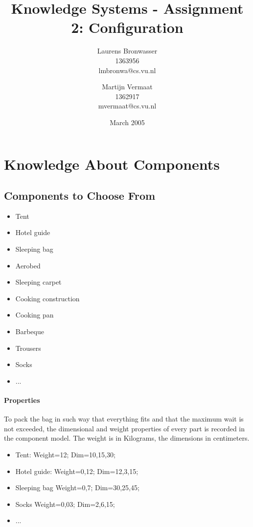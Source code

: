 \documentclass[a4paper,11pt]{article}
\title{Knowledge Systems - Assignment 2: Configuration}
\author{Laurens Bronwasser\\
1363956\\
lmbronwa@cs.vu.nl
\and
Martijn Vermaat\\
1362917\\
mvermaat@cs.vu.nl}
\date{March 2005}
\begin{document}
\maketitle




\tableofcontents


\section{Knowledge About Components}


\subsection*{Components to Choose From}

\begin{itemize}
\item Tent 
\item Hotel guide 
\item Sleeping bag 
\item Aerobed 
\item Sleeping carpet 
\item Cooking construction
\item Cooking pan
\item Barbeque
\item Trousers
\item Socks
\item ...
\end{itemize}

\paragraph{Properties}

To pack the bag in such way that everything fits and that the maximum wait is 
not exceeded, the dimensional and weight properties of every part is recorded in
the component model. The weight is in Kilograms, the dimensions in centimeters.

\begin{itemize}
\item Tent: Weight=12; Dim=10,15,30;
\item Hotel guide: Weight=0,12; Dim=12,3,15;
\item Sleeping bag Weight=0,7; Dim=30,25,45;
\item Socks Weight=0,03; Dim=2,6,15;
\item ...
\end{itemize}
\end{document}

